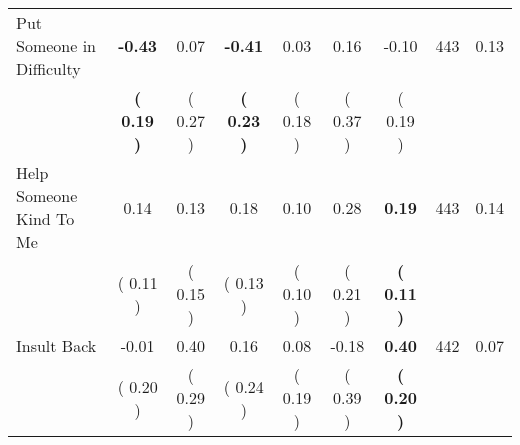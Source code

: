 \begin{tabular}{lcccccccc}
Put Someone in Difficulty & \textbf{    -0.43} &      0.07 & \textbf{    -0.41} &      0.03 &      0.16 &     -0.10 & 443 &       0.13 \\ 
 & \textbf{(     0.19 )} & (     0.27 ) & \textbf{(     0.23 )} & (     0.18 ) & (     0.37 ) & (     0.19 ) & \\
Help Someone Kind To Me &      0.14 &      0.13 &      0.18 &      0.10 &      0.28 & \textbf{     0.19} & 443 &       0.14 \\ 
 & (     0.11 ) & (     0.15 ) & (     0.13 ) & (     0.10 ) & (     0.21 ) & \textbf{(     0.11 )} & \\
Insult Back &     -0.01 &      0.40 &      0.16 &      0.08 &     -0.18 & \textbf{     0.40} & 442 &       0.07 \\ 
 & (     0.20 ) & (     0.29 ) & (     0.24 ) & (     0.19 ) & (     0.39 ) & \textbf{(     0.20 )} & \\
\bottomrule
\end{tabular}
